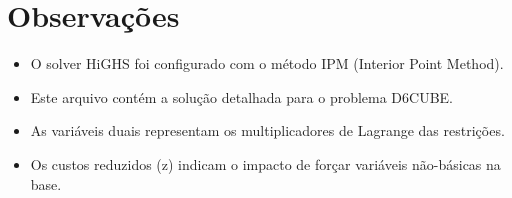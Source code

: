 \documentclass[12pt]{article}
\begin{document}
\section{Observações}

\begin{itemize}
\item O solver HiGHS foi configurado com o método IPM (Interior Point Method).
\item Este arquivo contém a solução detalhada para o problema D6CUBE.
\item As variáveis duais representam os multiplicadores de Lagrange das restrições.
\item Os custos reduzidos (z) indicam o impacto de forçar variáveis não-básicas na base.
\end{itemize}
\end{document}

